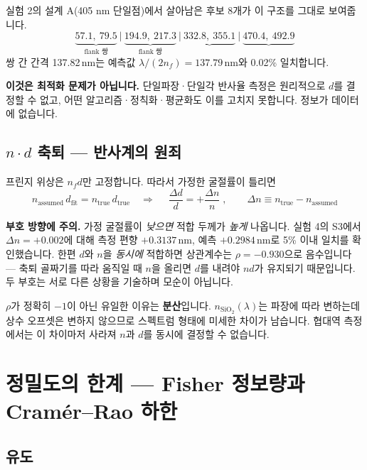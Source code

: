\documentclass[10pt,a4paper]{article}
\newcommand{\note}[1]{%
  \begin{tcolorbox}[enhanced,breakable,colback=white,colframe=accent,
    boxrule=0pt,leftrule=1.6pt,arc=0pt,outer arc=0pt,
    left=6pt,right=2pt,top=3pt,bottom=3pt,boxsep=0pt,
    before skip=5pt, after skip=8pt]
  #1
  \end{tcolorbox}}
\begin{document}
실험 2의 설계 A(405 nm 단일점)에서 살아남은 후보 8개가 이 구조를 그대로 보여줍니다.
\begin{equation*}
\underbrace{57.1,\ 79.5}_{\text{flank 쌍}}\ \Big|\ \underbrace{194.9,\ 217.3}_{\text{flank 쌍}}\ \Big|\ \underbrace{332.8,\ 355.1}\ \Big|\ \underbrace{470.4,\ 492.9}
\end{equation*}
쌍 간 간격 137.82\,nm는 예측값 $\lambda/(2n_f)=137.79$\,nm와 0.02\% 일치합니다.

\note{\textbf{이것은 최적화 문제가 아닙니다.} 단일파장·단일각 반사율 측정은 원리적으로 $d$를 결정할 수 없고, 어떤 알고리즘·정칙화·평균화도 이를 고치지 못합니다. 정보가 데이터에 없습니다.}

\subsection{\texorpdfstring{$n\cdot d$ 축퇴 — 반사계의 원죄}{n·d 축퇴 — 반사계의 원죄}}

프린지 위상은 $n_f d$만 고정합니다. 따라서 가정한 굴절률이 틀리면
\begin{equation}
n_{\text{assumed}}\,d_{\text{fit}} = n_{\text{true}}\,d_{\text{true}}
\quad\Longrightarrow\quad
\boxed{\;\frac{\Delta d}{d} = +\frac{\Delta n}{n}\;},\qquad \Delta n \equiv n_{\text{true}}-n_{\text{assumed}}
\end{equation}

\note{\textbf{부호 방향에 주의.} 가정 굴절률이 \emph{낮으면} 적합 두께가 \emph{높게} 나옵니다. 실험 4의 S3에서 $\Delta n=+0.002$에 대해 측정 편향 $+0.3137$\,nm, 예측 $+0.2984$\,nm로 5\% 이내 일치를 확인했습니다. 한편 $d$와 $n$을 \emph{동시에} 적합하면 상관계수는 $\rho=-0.930$으로 음수입니다 — 축퇴 골짜기를 따라 움직일 때 $n$을 올리면 $d$를 내려야 $nd$가 유지되기 때문입니다. 두 부호는 서로 다른 상황을 기술하며 모순이 아닙니다.}

$\rho$가 정확히 $-1$이 아닌 유일한 이유는 \textbf{분산}입니다. $n_{\text{SiO}_2}(\lambda)$는 파장에 따라 변하는데 상수 오프셋은 변하지 않으므로 스펙트럼 형태에 미세한 차이가 남습니다. 협대역 측정에서는 이 차이마저 사라져 $n$과 $d$를 동시에 결정할 수 없습니다.

\section{정밀도의 한계 — Fisher 정보량과 Cramér--Rao 하한}

\subsection{유도}
\end{document}
